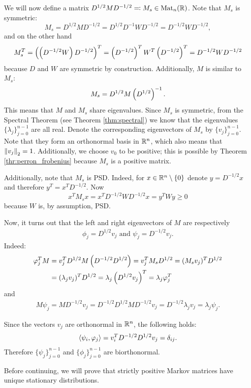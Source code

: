 We will now define a matrix $D^{1/2}MD^{-1/2}\eqqcolon M_s\in\text{Mat}_n(\mathbb{R})$. Note that $M_s$ is symmetric:
$$M_s=D^{1/2}MD^{-1/2}=D^{1/2}D^{-1}WD^{-1/2}=D^{-1/2}WD^{-1/2},$$
and on the other hand
$$M_s^T=\left( \left( D^{-1/2}W \right) D^{-1/2}\right)^T=\left( D^{-1/2} \right) ^T W^T \left( D^{-1/2}\right) ^T=D^{-1/2}WD^{-1/2}$$ because $D$ and $W$ are symmetric by construction. Additionally, $M$ is similar to $M_s$:
\begin{align*}
    M_s = D^{1/2} M \left( D^{1/2}\right) ^{-1}.
\end{align*} 
This means that $M$ and $M_s$ share eigenvalues. Since $M_s$ is symmetric, from the Spectral Theorem (see  Theorem \ref{thm:spectral}) we know that the eigenvalues $\{\lambda_j\}_{j=0}^{n-1}$ are all real. Denote the corresponding eigenvectors of $M_s$ by $\{ v_j\}_{j=0}^{n-1}$. Note that they form an orthonormal basis in $\mathbb{R}^n$, which also means that $\left\lVert v_j\right\rVert_2=1$. Additionally, we choose $v_0$ to be positive; this is possible by Theorem \ref{thr:perron_frobenius} because $M_s$ is a positive matrix.

Additionally, note that $M_s$ is PSD. 
Indeed, for $x\in\mathbb{R}^n\setminus \{0\}$ denote $y=D^{-1/2}x$ and therefore $y^T = x^TD^{-1/2}$.  Now 
$$x^TM_sx = x^TD^{-1/2}WD^{-1/2}x = y^TWy\geq 0$$ 
because $W$ is, by assumption, PSD.

Now, it turns out that the left and right eigenvectors of $M$ are respectively 
\begin{align*}
    \phi_j = D^{1/2}v_j \text{ and } \psi_j = D^{-1/2}v_j. 
\end{align*}
Indeed:
\begin{align*}
    \varphi_j^TM &= v_j^TD^{1/2}M \left( D^{-1/2}D^{1/2}\right) =v_j^TM_sD^{1/2} =(M_sv_j)^TD^{1/2} \\
    &= (\lambda_jv_j)^TD^{1/2} 
    = \lambda_j\left( D^{1/2} v_j\right)^T = \lambda_j\varphi_j^T
\end{align*}
and 
\begin{gather*}
    M\psi_j = MD^{-1/2}v_j = D^{-1/2}D^{1/2}MD^{-1/2}v_j=D^{-1/2}\lambda_jv_j=\lambda_j\psi_j.
\end{gather*}

Since the vectors $v_j$ are orthonormal in $\mathbb{R}^n$, the following holds:
\begin{gather*}
    \langle \psi_i, \varphi_j \rangle = v_i^TD^{-1/2}D^{1/2}v_j = \delta_{ij}.
\end{gather*}
Therefore $\{\psi_j\}_{j=0}^{n-1}$ and $\{\phi_j\}_{j=0}^{n-1}$ are biorthonormal.

Before continuing, we will prove that strictly positive Markov matrices have unique stationary distributions.

